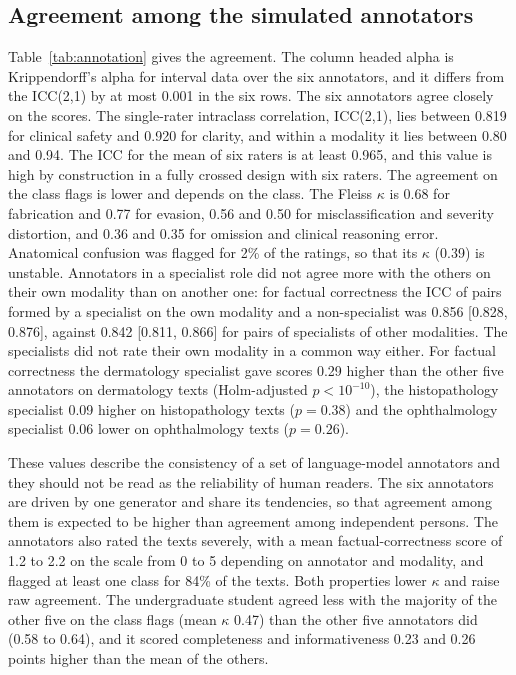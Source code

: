 \documentclass[11pt,a4paper]{article}
\begin{document}
\subsection{Agreement among the simulated annotators}\label{sec:val_agree}
Table~\ref{tab:annotation} gives the agreement. The column headed alpha is Krippendorff's alpha for interval data over the six annotators, and it differs from the ICC(2,1) by at most 0.001 in the six rows. The six annotators agree closely on the scores. The single-rater intraclass correlation, ICC(2,1), lies between 0.819 for clinical safety and 0.920 for clarity, and within a modality it lies between 0.80 and 0.94. The ICC for the mean of six raters is at least 0.965, and this value is high by construction in a fully crossed design with six raters. The agreement on the class flags is lower and depends on the class. The Fleiss $\kappa$ is 0.68 for fabrication and 0.77 for evasion, 0.56 and 0.50 for misclassification and severity distortion, and 0.36 and 0.35 for omission and clinical reasoning error. Anatomical confusion was flagged for 2\% of the ratings, so that its $\kappa$ (0.39) is unstable. Annotators in a specialist role did not agree more with the others on their own modality than on another one: for factual correctness the ICC of pairs formed by a specialist on the own modality and a non-specialist was 0.856 [0.828, 0.876], against 0.842 [0.811, 0.866] for pairs of specialists of other modalities. The specialists did not rate their own modality in a common way either. For factual correctness the dermatology specialist gave scores 0.29 higher than the other five annotators on dermatology texts (Holm-adjusted $p < 10^{-10}$), the histopathology specialist 0.09 higher on histopathology texts ($p = 0.38$) and the ophthalmology specialist 0.06 lower on ophthalmology texts ($p = 0.26$).

These values describe the consistency of a set of language-model annotators and they should not be read as the reliability of human readers. The six annotators are driven by one generator and share its tendencies, so that agreement among them is expected to be higher than agreement among independent persons. The annotators also rated the texts severely, with a mean factual-correctness score of 1.2 to 2.2 on the scale from 0 to 5 depending on annotator and modality, and flagged at least one class for 84\% of the texts. Both properties lower $\kappa$ and raise raw agreement. The undergraduate student agreed less with the majority of the other five on the class flags (mean $\kappa$ 0.47) than the other five annotators did (0.58 to 0.64), and it scored completeness and informativeness 0.23 and 0.26 points higher than the mean of the others.
\end{document}

